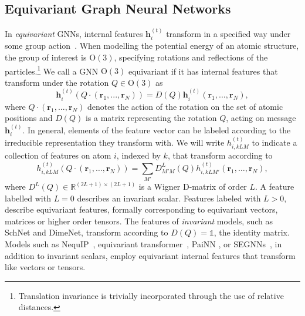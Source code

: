 \documentclass{article}
\def\rr{{\bm r}}
\def\R{\mathbb{R}}
\begin{document}
\subsection{Equivariant Graph Neural Networks}

In \emph{equivariant} GNNs, internal features $\bm h_i^{(t)}$ transform in a specified way under some group action~\cite{Anderson2019CormorantCM, TacoCohen2016,Risi_Equivariance,TensorField2018,SteerableCNN2018}.
When modelling the potential energy of an atomic structure, the group of interest is $\text{O}(3)$,
specifying rotations and reflections of the particles.\footnote{Translation invariance is trivially incorporated through the use of relative distances.}
We call a GNN $\text{O}(3)$ equivariant if it has internal features that transform under the rotation $Q \in \text{O}(3)$ as
%
\begin{equation}
  \label{eq:equivariant_const}
  \boldsymbol{h}^{(t)}_{i}(Q\cdot(\rr_{1},...,\rr_{N})) = D(Q)\boldsymbol{h}^{(t)}_{i}(\rr_{1},...,\rr_{N}),
\end{equation}
%
where $Q\cdot(\rr_{1},...,\rr_{N})$ denotes the action of the rotation on the set of atomic positions and $D(Q)$ is a matrix representing the rotation $Q$, acting on message $\boldsymbol{h}_{i}^{(t)}$.
In general, elements of the feature vector can be labeled according to the irreducible representation they transform with.
We will write $h_{i,kLM}^{(t)}$ to indicate a collection of features on atom $i$, indexed by $k$, that transform according to
\begin{equation}
  h_{i,kLM}^{(t)}(Q\cdot(\rr_1, \dots, \rr_N)) =
  \sum_{M'} D^L_{M' M}(Q)
  h_{i,kLM'}^{(t)}(\rr_1, \dots, \rr_N),
\end{equation}
where $D^L(Q) \in \R^{(2L+1) \times (2L+1)}$ is a Wigner D-matrix of order $L$.
A feature labelled with $L = 0$ describes an invariant scalar.
Features labeled with $L > 0$, describe equivariant features, formally corresponding to equivariant vectors, matrices or higher order tensors.
%
The features of \emph{invariant} models, such as SchNet\cite{schnet} and DimeNet\cite{DimeNet},
transform according to $D(Q) = \mathds{1}$, the identity matrix. Models such as NequIP~\cite{nequip},
equivariant transformer~\cite{torchmd-net2022},
PaiNN \cite{Schutt2021PaiNN},
or SEGNNs~\cite{Brandstetter2021Geometric}, in addition to invariant scalars, employ equivariant internal features that transform like vectors or tensors.
\end{document}
